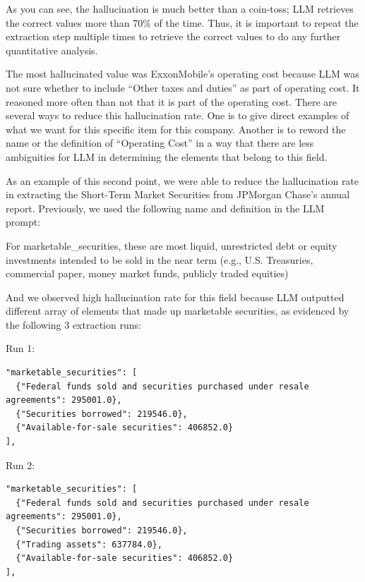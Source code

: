 \documentclass[12pt,a4paper]{article}
\begin{document}
As you can see, the hallucination is much better than a coin-toss; LLM
retrieves the correct values more than 70\% of the time. Thus, it is
important to repeat the extraction step multiple times to retrieve the
correct values to do any further quantitative analysis.

The most hallucinated value was ExxonMobile's operating cost because LLM
was not sure whether to include ``Other taxes and duties'' as part of
operating cost. It reasoned more often than not that it is part of the
operating cost. There are several ways to reduce this hallucination
rate. One is to give direct examples of what we want for this specific
item for this company. Another is to reword the name or the definition
of ``Operating Cost'' in a way that there are less ambiguities for LLM
in determining the elements that belong to this field.

As an example of this second point, we were able to reduce the
hallucination rate in extracting the Short-Term Market Securities from
JPMorgan Chase's annual report. Previously, we used the following name
and definition in the LLM prompt:

For marketable\_securities, these are most liquid, unrestricted debt or
equity investments intended to be sold in the near term (e.g., U.S.
Treasuries, commercial paper, money market funds, publicly traded
equities)

And we observed high hallucination rate for this field because LLM
outputted different array of elements that made up marketable
securities, as evidenced by the following 3 extraction runs:

Run 1:

\begin{lstlisting}[style=json, caption={JPMorgan Chase marketable securities extraction --- Run 1}, label=lst:hallucination_run1]
"marketable_securities": [
  {"Federal funds sold and securities purchased under resale agreements": 295001.0},
  {"Securities borrowed": 219546.0},
  {"Available-for-sale securities": 406852.0}
],
\end{lstlisting}

Run 2:

\begin{lstlisting}[style=json, caption={JPMorgan Chase marketable securities extraction --- Run 2}, label=lst:hallucination_run2]
"marketable_securities": [
  {"Federal funds sold and securities purchased under resale agreements": 295001.0},
  {"Securities borrowed": 219546.0},
  {"Trading assets": 637784.0},
  {"Available-for-sale securities": 406852.0}
],
\end{lstlisting}
\end{document}
